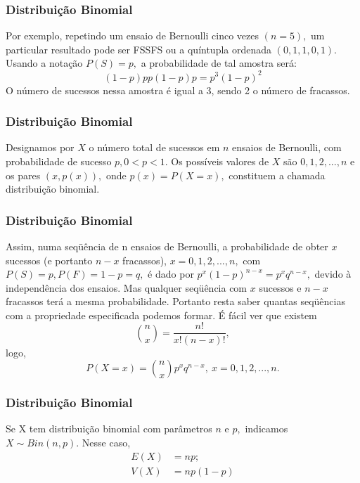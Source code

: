 \documentclass[14pt,aspectratio=1610]{beamer}
\begin{document}
\begin{frame}{}
\frametitle{Distribuição Binomial}
\begin{block}{}
\justifying
Por exemplo, repetindo um ensaio de Bernoulli cinco vezes $(n = 5),$ um particular resultado pode ser FSSFS ou a quíntupla ordenada $(0, 1, 1, 0, 1).$ Usando a notação 
$P(S) = p,$ a probabilidade de tal amostra será:
$$(1-p)pp(1-p)p=p^{3}(1-p)^{2}$$
O número de sucessos nessa amostra é igual a 3, sendo 2 o número de fracassos.
\end{block}
\end{frame}

\begin{frame}{}
\frametitle{Distribuição Binomial}
\begin{block}{}
\justifying
Designamos por $X$ o número total de sucessos em $n$ ensaios de Bernoulli, com
probabilidade de sucesso $p, 0 < p < 1.$ Os possíveis valores de $X$ são $0, 1, 2, ..., n$ e os pares $(x, p(x)),$ onde $p(x) = P(X = x),$ constituem a chamada distribuição binomial.
\end{block}
\end{frame}

\begin{frame}{}
\frametitle{Distribuição Binomial}
\begin{block}{}
\justifying
Assim, numa seqüência de n ensaios de Bernoulli, a probabilidade de obter $x$ sucessos (e portanto $n-x$ fracassos), $x = 0,1,2, ..., n,$ com $P(S) = p, P(F) = 1-p = q,$ é dado por $p^{x}(1-p)^{n-x}=p^{x}q^{n-x},$ devido à independência dos ensaios. Mas qualquer seqüência com $x$ sucessos e $n-x$ fracassos terá a mesma probabilidade. Portanto resta saber quantas seqüências com a propriedade especificada podemos formar. É fácil ver que existem $$\binom{n}{x}=\dfrac{n!}{x!(n-x)!},$$ logo, 
$$P(X=x)=\binom{n}{x}p^{x}q^{n-x},\ x = 0,1,2, ..., n.$$
\end{block}
\end{frame}

\begin{frame}{}
\frametitle{Distribuição Binomial}
\begin{block}{}
\justifying
Se X tem distribuição binomial com parâmetros $n$ e $p,$ indicamos $X\sim Bin(n,p).$ Nesse caso, 
\begin{align*}
E(X)&=np;\\
V(X)&=np(1-p)
\end{align*}
\end{block}
\end{frame}
\end{document}
